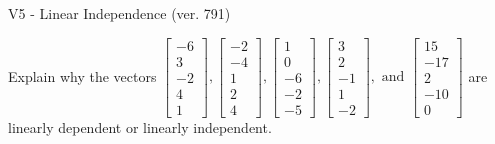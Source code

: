 \begin{exercise}
  \begin{exerciseTitle}V5 - Linear Independence (ver. 791)\end{exerciseTitle}
  \begin{exerciseStatement}
    Explain why the vectors \(\left[\begin{array}{r}
-6 \\
3 \\
-2 \\
4 \\
1
\end{array}\right] , \left[\begin{array}{r}
-2 \\
-4 \\
1 \\
2 \\
4
\end{array}\right] , \left[\begin{array}{r}
1 \\
0 \\
-6 \\
-2 \\
-5
\end{array}\right] , \left[\begin{array}{r}
3 \\
2 \\
-1 \\
1 \\
-2
\end{array}\right] , \text{ and } \left[\begin{array}{r}
15 \\
-17 \\
2 \\
-10 \\
0
\end{array}\right]\) are linearly dependent or linearly independent.	



\end{exerciseStatement}
\end{exercise}
